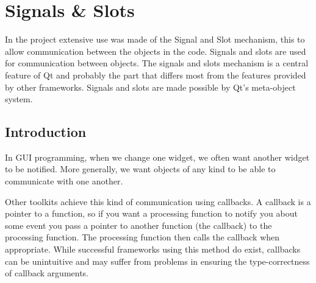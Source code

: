 %
\section{Signals \& Slots}
\label{ref:soft-signal-slot}
In the project extensive use was made of the Signal and Slot mechanism, this to
allow communication between the objects in the code. Signals and slots are used
for communication between objects. The signals and slots mechanism is a central
feature of Qt and probably the part that differs most from the features provided
by other frameworks. Signals and slots are made possible by Qt's meta-object
system.\cite{Qt:signal-slot}

\subsection{Introduction}
\label{ssec:soft-intro}
In GUI programming, when we change one widget, we often want another widget to
be notified. More generally, we want objects of any kind to be able to
communicate with one another.

Other toolkits achieve this kind of communication using callbacks. A callback is
a pointer to a function, so if you want a processing function to notify you
about some event you pass a pointer to another function (the callback) to the
processing function. The processing function then calls the callback when
appropriate. While successful frameworks using this method do exist, callbacks
can be unintuitive and may suffer from problems in ensuring the type-correctness
of callback arguments.\cite{Qt:signal-slot}


